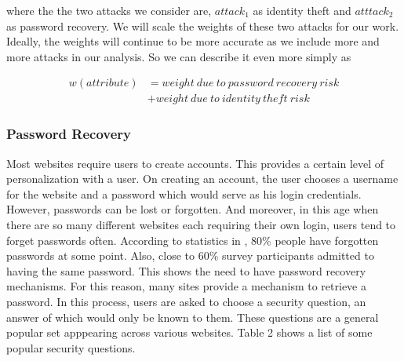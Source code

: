 \documentclass[10pt,conference]{IEEEtran}
\begin{document}
where the the two attacks we consider are, $ attack_1 $ as identity theft and $ atttack_2 $ as password recovery. We will scale the weights of these two attacks for our work. Ideally, the weights will continue to be more accurate as we include more and more attacks in our analysis. So we can describe it even more simply as

\begin{align*}
w(attribute) &= weight\ due\ to\ password\ recovery\ risk \\
		&+ weight\ due\ to\ identity\ theft\ risk
\end{align*}

\subsubsection{Password Recovery}
Most websites require users to create accounts. This provides a certain level of personalization with a user. On creating an account, the user chooses a username for the website and a password which would serve as his login credentials. However, passwords can be lost or forgotten. And moreover, in this age when there are so many different websites each requiring their own login, users tend to forget passwords often. According to statistics in \cite{passwordstats}, 80\% people have forgotten passwords at some point. Also, close to 60\% survey participants admitted to having the same password. This shows the need to have password recovery mechanisms. For this reason, many sites provide a mechanism to retrieve a password. In this process, users are asked to choose a security question, an answer of which would only be known to them. These questions are a general popular set apppearing across various websites. Table 2 shows a list of some popular security questions. 
\end{document}

